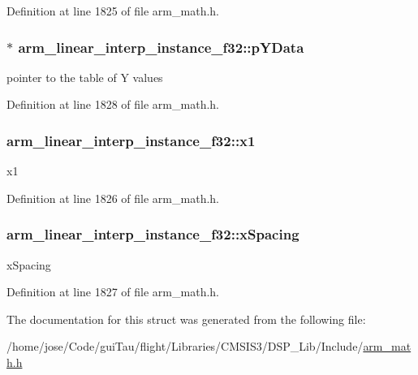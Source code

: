 Definition at line 1825 of file arm\-\_\-math.\-h.

\hypertarget{structarm__linear__interp__instance__f32_ab373001f6afad0850359c344a4d7eee4}{
\subsubsection[{p\-Y\-Data}]{$\ast$ arm\-\_\-linear\-\_\-interp\-\_\-instance\-\_\-f32\-::p\-Y\-Data}}\label{structarm__linear__interp__instance__f32_ab373001f6afad0850359c344a4d7eee4}
pointer to the table of Y values 

Definition at line 1828 of file arm\-\_\-math.\-h.

\hypertarget{structarm__linear__interp__instance__f32_a08352dc6ea82fbc0827408e018535481}{
\subsubsection[{x1}]{ arm\-\_\-linear\-\_\-interp\-\_\-instance\-\_\-f32\-::x1}}\label{structarm__linear__interp__instance__f32_a08352dc6ea82fbc0827408e018535481}
x1 

Definition at line 1826 of file arm\-\_\-math.\-h.

\hypertarget{structarm__linear__interp__instance__f32_aa8e2d686b5434a406d390b347b183511}{
\subsubsection[{x\-Spacing}]{ arm\-\_\-linear\-\_\-interp\-\_\-instance\-\_\-f32\-::x\-Spacing}}\label{structarm__linear__interp__instance__f32_aa8e2d686b5434a406d390b347b183511}
x\-Spacing 

Definition at line 1827 of file arm\-\_\-math.\-h.



The documentation for this struct was generated from the following file\-:\begin{DoxyCompactItemize}
\item 
/home/jose/\-Code/gui\-Tau/flight/\-Libraries/\-C\-M\-S\-I\-S3/\-D\-S\-P\-\_\-\-Lib/\-Include/\hyperlink{arm__math_8h}{arm\-\_\-math.\-h}\end{DoxyCompactItemize}
